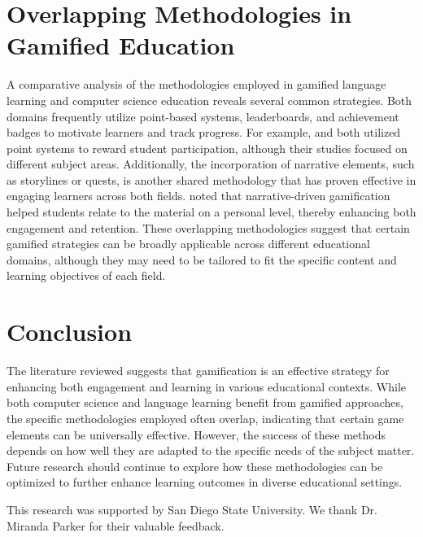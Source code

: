 \documentclass[sigconf,review]{acmart} %
\begin{document}
\section{Overlapping Methodologies in Gamified Education}
A comparative analysis of the methodologies employed in gamified language learning and computer science education reveals several common strategies. Both domains frequently utilize point-based systems, leaderboards, and achievement badges to motivate learners and track progress. For example, \citet{article7} and \citet{article8} both utilized point systems to reward student participation, although their studies focused on different subject areas. Additionally, the incorporation of narrative elements, such as storylines or quests, is another shared methodology that has proven effective in engaging learners across both fields. \citet{article9} noted that narrative-driven gamification helped students relate to the material on a personal level, thereby enhancing both engagement and retention. These overlapping methodologies suggest that certain gamified strategies can be broadly applicable across different educational domains, although they may need to be tailored to fit the specific content and learning objectives of each field.

\section{Conclusion}
The literature reviewed suggests that gamification is an effective strategy for enhancing both engagement and learning in various educational contexts. While both computer science and language learning benefit from gamified approaches, the specific methodologies employed often overlap, indicating that certain game elements can be universally effective. However, the success of these methods depends on how well they are adapted to the specific needs of the subject matter. Future research should continue to explore how these methodologies can be optimized to further enhance learning outcomes in diverse educational settings.

\begin{acks}
This research was supported by San Diego State University. We thank Dr. Miranda Parker for their valuable feedback.
\end{acks}



\end{document}
